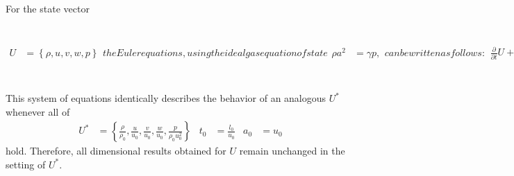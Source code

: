 For the state vector
\begin{subequations}
\label{eq:eulerprim}
\begin{align}
  U &= \left\{ \rho, u, v, w, p \right\}
\end{align}
the Euler equations, using the ideal gas equation of state
\begin{align}
  \rho a^2 &= \gamma p,
\end{align}
can be written as follows:
\begin{align}
    \frac{\partial\!}{\partial\!t}U
+ A \frac{\partial\!}{\partial\!x}U
+ B \frac{\partial\!}{\partial\!y}U
+ C \frac{\partial\!}{\partial\!z}U
&= 0
\end{align}
\begin{align}
 A &= \begin{bmatrix}
        u & \rho     & 0 & 0 & 0              \\
        0 & u        & 0 & 0 & \frac{1}{\rho} \\
        0 & 0        & u & 0 & 0              \\
        0 & 0        & 0 & u & 0              \\
        0 & \gamma p & 0 & 0 & u              \\
       \end{bmatrix}
&
 B &= \begin{bmatrix}
        v & 0 & \rho     & 0 & 0              \\
        0 & v & 0        & 0 & 0              \\
        0 & 0 & v        & 0 & \frac{1}{\rho} \\
        0 & 0 & 0        & v & 0              \\
        0 & 0 & \gamma p & 0 & v              \\
       \end{bmatrix}
&
 C &= \begin{bmatrix}
        w & 0 & 0 & \rho     & 0              \\
        0 & w & 0 & 0        & 0              \\
        0 & 0 & w & 0        & 0              \\
        0 & 0 & 0 & w        & \frac{1}{\rho} \\
        0 & 0 & 0 & \gamma p & w              \\
      \end{bmatrix}.
\end{align}
\end{subequations}
This system of equations identically describes the behavior of an analogous
$U^*$ whenever all of
\begin{align}
\label{eq:eulerprimnondim}
U^{*} &= \left\{
  \frac{\rho}{\rho_0},
  \frac{u}{u_0},
  \frac{v}{u_0},
  \frac{w}{u_0},
  \frac{p}{\rho_0 u_0^2}
\right\}
&
t_0 &= \frac{l_0}{u_0}
&
a_0 &= u_0
\end{align}
hold.  Therefore, all dimensional results obtained for $U$ remain unchanged
in the setting of $U^*$.


